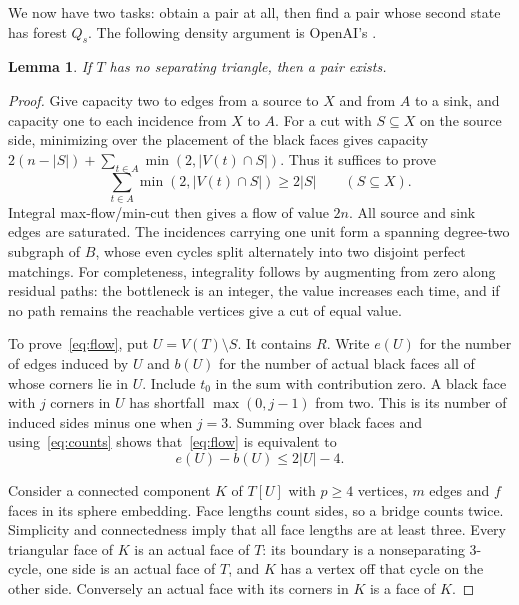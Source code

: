 \documentclass[10pt,a4paper]{amsart}
\newtheorem{lemma}[theorem]{Lemma}
\theoremstyle{remark}
\begin{document}
We now have two tasks: obtain a pair at all, then find a pair whose second state has forest $Q_s$. The following density argument is OpenAI's \cite[Proposition 3.1]{openai2026}.
\begin{lemma}\label{lem:pair}
If $T$ has no separating triangle, then a pair exists.
\end{lemma}
\begin{proof}
Give capacity two to edges from a source to $X$ and from $A$ to a sink, and capacity one to each incidence from $X$ to $A$. For a cut with $S\subseteq X$ on the source side, minimizing over the placement of the black faces gives capacity
$2(n-|S|)+\sum_{t\in A}\min(2,|V(t)\cap S|)$.
Thus it suffices to prove
\begin{equation}\label{eq:flow}
 \sum_{t\in A}\min(2,|V(t)\cap S|)\geq2|S|\qquad(S\subseteq X).
\end{equation}
Integral max-flow/min-cut \cite{ford1956} then gives a flow of value $2n$. All source and sink edges are saturated. The incidences carrying one unit form a spanning degree-two subgraph of $B$, whose even cycles split alternately into two disjoint perfect matchings. For completeness, integrality follows by augmenting from zero along residual paths: the bottleneck is an integer, the value increases each time, and if no path remains the reachable vertices give a cut of equal value.

To prove~\eqref{eq:flow}, put $U=V(T)\setminus S$. It contains $R$. Write $e(U)$ for the number of edges induced by $U$ and $b(U)$ for the number of actual black faces all of whose corners lie in $U$. Include $t_0$ in the sum with contribution zero. A black face with $j$ corners in $U$ has shortfall $\max(0,j-1)$ from two. This is its number of induced sides minus one when $j=3$. Summing over black faces and using~\eqref{eq:counts} shows that~\eqref{eq:flow} is equivalent to
\begin{equation}\label{eq:density}
 e(U)-b(U)\leq2|U|-4.
\end{equation}

Consider a connected component $K$ of $T[U]$ with $p\geq4$ vertices, $m$ edges and $f$ faces in its sphere embedding. Face lengths count sides, so a bridge counts twice. Simplicity and connectedness imply that all face lengths are at least three. Every triangular face of $K$ is an actual face of $T$: its boundary is a nonseparating 3-cycle, one side is an actual face of $T$, and $K$ has a vertex off that cycle on the other side. Conversely an actual face with its corners in $K$ is a face of $K$.


\end{proof}
\end{document}
